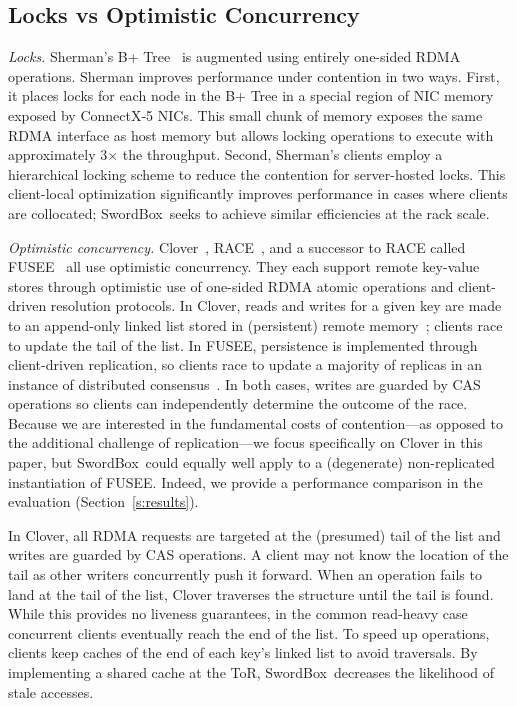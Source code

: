 \documentclass[12pt]{ucsddissertation}
\newcommand{\sword}{SwordBox}
\begin{document}
\subsection{Locks vs Optimistic Concurrency}
\label{sec:lock-vs-op}

\emph{Locks.} Sherman's B+ Tree~\cite{sherman} is augmented using entirely one-sided RDMA
operations. Sherman improves performance under contention in two ways. First, it places locks for
each node in the B+ Tree in a special region of NIC memory exposed by ConnectX-5 NICs. This small
chunk of memory exposes the same RDMA interface as host memory but allows locking operations to
execute with approximately 3$\times$ the throughput. Second, Sherman's clients employ a hierarchical
locking scheme to reduce the contention for server-hosted locks. This client-local optimization
significantly improves performance in cases where clients are collocated; \sword\ seeks to achieve
similar efficiencies at the rack scale.

\emph{Optimistic concurrency.} Clover~\cite{clover}, RACE~\cite{race}, and a successor to RACE
called FUSEE~\cite{fusee} all use optimistic concurrency. They each support remote key-value stores
through optimistic use of one-sided RDMA atomic operations and client-driven resolution protocols.
In Clover, reads and writes for a given key are made to an append-only linked list stored in
(persistent) remote memory~\cite{clover}; clients race to update the tail of the list. In FUSEE,
persistence is implemented through client-driven replication, so clients race to update a majority
of replicas in an instance of distributed consensus~\cite{fusee}. In both cases, writes are guarded
by CAS operations so clients can independently determine the outcome of the race. Because we are
interested in the fundamental costs of contention—as opposed to the additional challenge of
replication—we focus specifically on Clover in this paper, but \sword\ could equally well apply to a
(degenerate) non-replicated instantiation of FUSEE. Indeed, we provide a performance comparison in
the evaluation (Section~\ref{s:results}).

In Clover, all RDMA requests are targeted at the (presumed) tail of the list and writes are guarded
by CAS operations. A client may not know the location of the tail as other writers concurrently push
it forward. When an operation fails to land at the tail of the list, Clover traverses the structure
until the tail is found. While this provides no liveness guarantees, in the common read-heavy case
concurrent clients eventually reach the end of the list. To speed up operations, clients keep caches
of the end of each key's linked list to avoid traversals. By implementing a shared cache at the ToR,
\sword\ decreases the likelihood of stale accesses.
\end{document}
